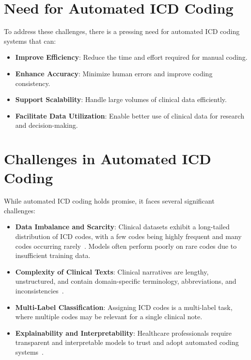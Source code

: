 \documentclass[12pt,a4paper]{report}
\begin{document}
\section{Need for Automated ICD Coding}
To address these challenges, there is a pressing need for automated ICD coding systems that can:
\begin{itemize}
    \item \textbf{Improve Efficiency}: Reduce the time and effort required for manual coding.
    \item \textbf{Enhance Accuracy}: Minimize human errors and improve coding consistency.
    \item \textbf{Support Scalability}: Handle large volumes of clinical data efficiently.
    \item \textbf{Facilitate Data Utilization}: Enable better use of clinical data for research and decision-making.
\end{itemize}

\section{Challenges in Automated ICD Coding}
While automated ICD coding holds promise, it faces several significant challenges:
\begin{itemize}
    \item \textbf{Data Imbalance and Scarcity}: Clinical datasets exhibit a long-tailed distribution of ICD codes, with a few codes being highly frequent and many codes occurring rarely~\cite{rios2018few}. Models often perform poorly on rare codes due to insufficient training data.
    \item \textbf{Complexity of Clinical Texts}: Clinical narratives are lengthy, unstructured, and contain domain-specific terminology, abbreviations, and inconsistencies~\cite{wrenn2010quantifying}.
    \item \textbf{Multi-Label Classification}: Assigning ICD codes is a multi-label task, where multiple codes may be relevant for a single clinical note.
    \item \textbf{Explainability and Interpretability}: Healthcare professionals require transparent and interpretable models to trust and adopt automated coding systems~\cite{holzinger2017we}.
\end{itemize}
\end{document}
